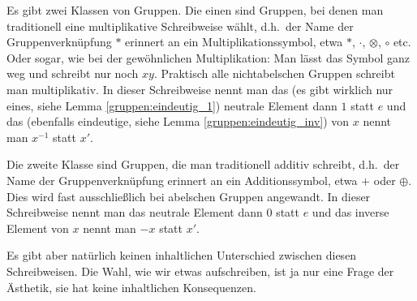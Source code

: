 \begin{remark}
    Es gibt zwei Klassen von Gruppen. Die einen sind Gruppen, bei denen man traditionell eine multiplikative Schreibweise wählt, d.h.\ der Name der Gruppenverknüpfung $\ast$ erinnert an ein Multiplikationssymbol, etwa $*$, $\cdot$, $\otimes$, $\circ$ etc. Oder sogar, wie bei der gewöhnlichen Multiplikation: Man lässt das Symbol ganz weg und schreibt nur noch $xy$. Praktisch alle nichtabelschen Gruppen schreibt man multiplikativ. In dieser Schreibweise nennt man das (es gibt wirklich nur eines, siehe Lemma \ref{gruppen:eindeutig_1}) neutrale Element dann $1$ statt $e$ und das (ebenfalls eindeutige, siehe Lemma \ref{gruppen:eindeutig_inv}) von $x$ nennt man $x^{-1}$ statt $x'$.

    Die zweite Klasse sind Gruppen, die man traditionell additiv schreibt, d.h.\ der Name der Gruppenverknüpfung erinnert an ein Additionssymbol, etwa $+$ oder $\oplus$. Dies wird fast ausschließlich bei abelschen Gruppen angewandt. In dieser Schreibweise nennt man das neutrale Element dann $0$ statt $e$ und das inverse Element von $x$ nennt man $-x$ statt $x'$.

    Es gibt aber natürlich keinen inhaltlichen Unterschied zwischen diesen Schreibweisen. Die Wahl, wie wir etwas aufschreiben, ist ja nur eine Frage der Ästhetik, sie hat keine inhaltlichen Konsequenzen.
\end{remark}

